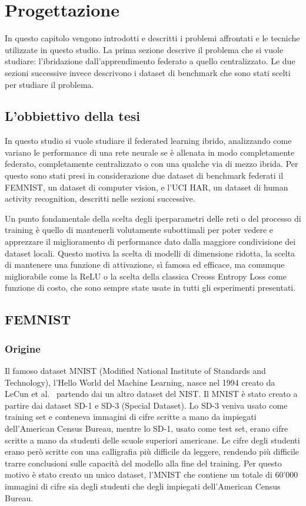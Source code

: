 \chapter{Progettazione}
In questo capitolo vengono introdotti e descritti i problemi affrontati 
e le tecniche utilizzate in questo studio. La prima sezione descrive 
il problema che si vuole studiare: l'ibridazione dall'apprendimento 
federato a quello centralizzato. Le due sezioni successive invece 
descrivono i dataset di benchmark che sono stati scelti per studiare 
il problema.


\section{L'obbiettivo della tesi}
In questo studio si vuole studiare il federated learning ibrido,
analizzando come variano le performance di una rete neurale se è 
allenata in modo completamente federato, completamente centralizzato 
o con una qualche via di mezzo ibrida. Per questo sono stati presi in
considerazione due dataset di benchmark federati il FEMNIST, 
un dataset di computer vision, e l'UCI HAR, un dataset di human activity
recognition, descritti nelle sezioni successive.

Un punto fondamentale della scelta degli iperparametri delle reti o 
del processo di training è quello di 
mantenerli volutamente subottimali per poter vedere e apprezzare il 
miglioramento di performance dato dalla maggiore condivisione dei 
dataset locali. Questo motiva la scelta di modelli di dimensione 
ridotta, la scelta di mantenere una funzione di attivazione, sì 
famosa ed efficace, ma comunque migliorabile come la ReLU o la scelta 
della classica Creoss Entropy Loss come funzione di costo, che sono 
sempre state usate in tutti gli esperimenti presentati.


\section{FEMNIST}
\subsection{Origine}
Il famoso dataset MNIST (Modified National Institute of Standards and
Technology), l'Hello World del Machine Learning, nasce nel 1994 creato 
da LeCun et al.~\cite{lecun1998mnist} partendo dai un altro dataset 
del NIST.
Il MNIST è stato creato a partire dai dataset SD-1 e SD-3 (Special
Dataset). Lo SD-3 veniva usato come training set e conteneva immagini
di cifre scritte a mano da impiegati dell'American Census Bureau,
mentre lo SD-1, usato come test set, erano cifre scritte a mano da 
studenti delle scuole superiori americane. Le cifre degli studenti
erano però scritte con una calligrafia più difficile da leggere, rendendo più 
difficile trarre conclusioni sulle capacità del modello alla fine del
training. Per questo motivo è stato creato un unico dataset, l'MNIST 
che contiene un totale di 60'000 immagini di cifre sia degli studenti
che degli impiegati dell'American Census Bureau.

